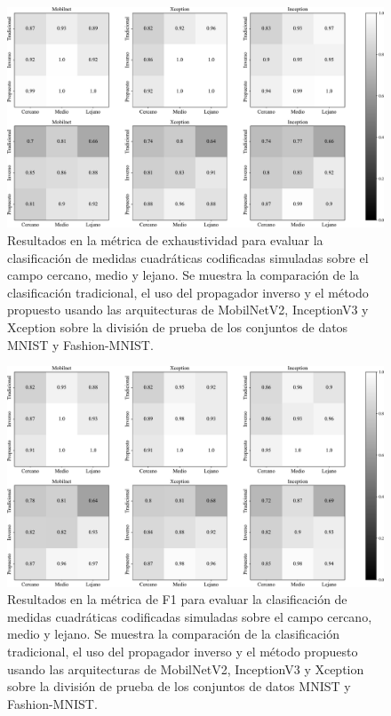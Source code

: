 \begin{figure}[!h]
    \centering
    \includegraphics[width=\linewidth]{images/resultados/test_result_Exhaustividad.pdf}
    \caption{Resultados en la métrica de exhaustividad para evaluar la clasificación de medidas cuadráticas codificadas simuladas sobre el campo cercano, medio y lejano. Se muestra la comparación de la clasificación tradicional, el uso del propagador inverso y el método propuesto usando las arquitecturas de MobilNetV2, InceptionV3 y Xception sobre la división de prueba de los conjuntos de datos MNIST y Fashion-MNIST.}
    \label{fig:results_rec}
\end{figure}

\begin{figure}[!h]
    \centering
    \includegraphics[width=\linewidth]{images/resultados/test_result_F1.pdf}
    \caption{Resultados en la métrica de F1 para evaluar la clasificación de medidas cuadráticas codificadas simuladas sobre el campo cercano, medio y lejano. Se muestra la comparación de la clasificación tradicional, el uso del propagador inverso y el método propuesto usando las arquitecturas de MobilNetV2, InceptionV3 y Xception sobre la división de prueba de los conjuntos de datos MNIST y Fashion-MNIST.}
    \label{fig:results_f1}
\end{figure}